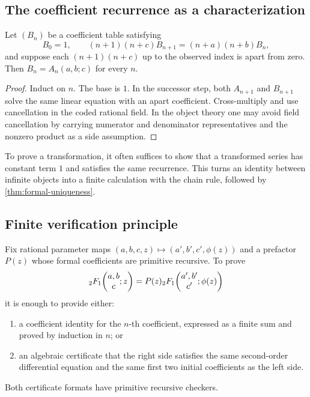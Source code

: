 \subsection{The coefficient recurrence as a characterization}

\begin{theorem}\label{thm:formal-uniqueness}
Let \((B_n)\) be a coefficient table satisfying
\[
 B_0=1,
 \qquad
 (n+1)(n+c)B_{n+1}=(n+a)(n+b)B_n,
\]
and suppose each \((n+1)(n+c)\) up to the observed index is apart from zero.
Then \(B_n=A_n(a,b;c)\) for every \(n\).
\end{theorem}

\begin{proof}
Induct on \(n\).  The base is \(1\).  In the successor step, both \(A_{n+1}\)
and \(B_{n+1}\) solve the same linear equation with an apart coefficient.
Cross-multiply and use cancellation in the coded rational field.  In the
object theory one may avoid field cancellation by carrying numerator and
denominator representatives and the nonzero product as a side assumption.
\end{proof}

\begin{remark}
To prove a transformation, it often suffices to show that a transformed
series has constant term \(1\) and satisfies the same recurrence.  This turns
an identity between infinite objects into a finite calculation with the
chain rule, followed by \cref{thm:formal-uniqueness}.
\end{remark}

\subsection{Finite verification principle}

\begin{proposition}\label{prop:certificate-checker}
Fix rational parameter maps
\((a,b,c,z)\mapsto(a',b',c',\phi(z))\) and a prefactor \(P(z)\) whose formal
coefficients are primitive recursive.  To prove
\[
 {}_2F_1\!\left(\begin{matrix}a,b\\c\end{matrix};z\right)=P(z){}_2F_1\!\left(\begin{matrix}a',b'\\c'\end{matrix};\phi(z)\right)
\]
it is enough to provide either:
\begin{enumerate}
\item a coefficient identity for the \(n\)-th coefficient, expressed as a
finite sum and proved by induction in \(n\); or
\item an algebraic certificate that the right side satisfies the same
second-order differential equation and the same first two initial
coefficients as the left side.
\end{enumerate}
Both certificate formats have primitive recursive checkers.
\end{proposition}

